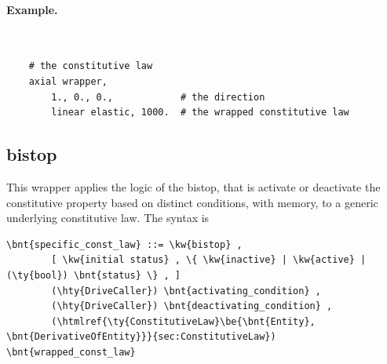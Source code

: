 \paragraph{Example.} \
\begin{verbatim}
    # the constitutive law
    axial wrapper,
        1., 0., 0.,            # the direction
        linear elastic, 1000.  # the wrapped constitutive law
\end{verbatim}


\subsection{bistop}
This wrapper applies the logic of the bistop, that is activate or deactivate
the constitutive property based on distinct conditions, with memory,
to a generic underlying constitutive law.
The syntax is
\begin{Verbatim}[commandchars=\\\{\}]
    \bnt{specific_const_law} ::= \kw{bistop} ,
        [ \kw{initial status} , \{ \kw{inactive} | \kw{active} | (\ty{bool}) \bnt{status} \} , ]
        (\hty{DriveCaller}) \bnt{activating_condition} ,
        (\hty{DriveCaller}) \bnt{deactivating_condition} ,
        (\htmlref{\ty{ConstitutiveLaw}\be{\bnt{Entity}, \bnt{DerivativeOfEntity}}}{sec:ConstitutiveLaw}) \bnt{wrapped_const_law}
\end{Verbatim}


